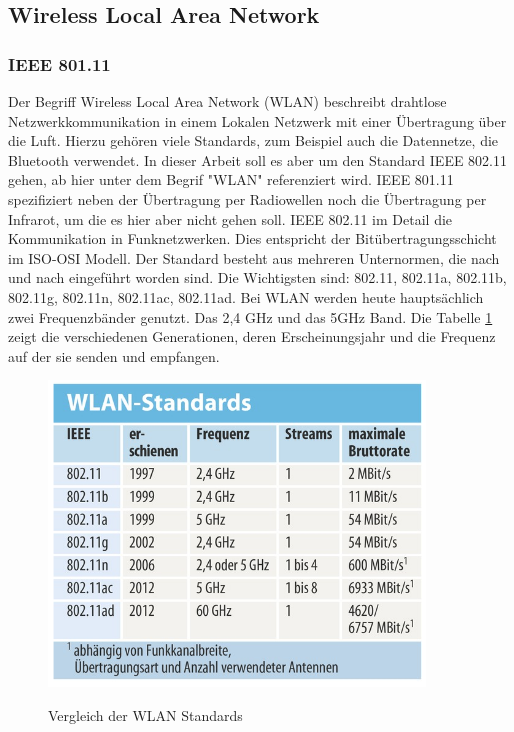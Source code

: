 \documentclass{scrartcl}%
\begin{document}
\subsection{Wireless Local Area Network}
\subsubsection{IEEE 801.11}
Der Begriff Wireless Local Area Network (WLAN) beschreibt drahtlose Netzwerkkommunikation in einem Lokalen Netzwerk mit einer Übertragung über die Luft. Hierzu gehören viele Standards, zum Beispiel auch die Datennetze, die Bluetooth verwendet. In dieser Arbeit soll es aber um den Standard IEEE 802.11 gehen, ab hier unter dem Begrif "WLAN" referenziert wird. IEEE 801.11 spezifiziert neben der Übertragung per Radiowellen noch die Übertragung per Infrarot, um die es hier aber nicht gehen soll. IEEE 802.11 im Detail die Kommunikation in Funknetzwerken. Dies entspricht der Bitübertragungsschicht im ISO-OSI Modell. Der Standard besteht aus mehreren Unternormen, die nach und nach eingeführt worden sind. Die Wichtigsten sind:  802.11, 802.11a, 802.11b, 802.11g, 802.11n, 802.11ac, 802.11ad. Bei WLAN werden heute hauptsächlich zwei Frequenzbänder genutzt. Das 2,4 GHz und das 5GHz Band. Die Tabelle \ref{wlanStandards} zeigt die verschiedenen Generationen, deren Erscheinungsjahr und die Frequenz auf der sie senden und empfangen.

\begin{figure}[h]
	\centering
	\caption{Vergleich der WLAN Standards \cite{heiseWlan}}
	\includegraphics[width=10cm]{bilder/heise-de-wlan-standards}
	\newline
	\label{wlanStandards}
\end{figure}
\end{document}
